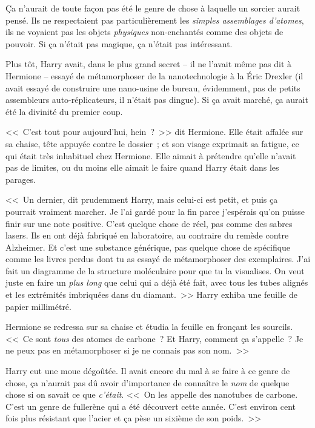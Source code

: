 Ça n'aurait de toute façon pas été le genre de chose à laquelle un sorcier aurait pensé. Ils ne respectaient pas particulièrement les \emph{simples assemblages d'atomes}, ils ne voyaient pas les objets \emph{physiques} non-enchantés comme des objets de pouvoir. Si ça n'était pas magique, ça n'était pas intéressant.

Plus tôt, Harry avait, dans le plus grand secret -- il ne l'avait même pas dit à Hermione -- essayé de métamorphoser de la nanotechnologie à la Éric Drexler (il avait essayé de construire une nano-usine de bureau, évidemment, pas de petits assembleurs auto-réplicateurs, il n'était pas dingue). Si ça avait marché, ça aurait été la divinité du premier coup.

<<~C'est tout pour aujourd'hui, hein~?~>> dit Hermione. Elle était affalée sur sa chaise, tête appuyée contre le dossier~; et son visage exprimait sa fatigue, ce qui était très inhabituel chez Hermione. Elle aimait à prétendre qu'elle n'avait pas de limites, ou du moins elle aimait le faire quand Harry était dans les parages.

<<~Un dernier, dit prudemment Harry, mais celui-ci est petit, et puis ça pourrait vraiment marcher. Je l'ai gardé pour la fin parce j'espérais qu'on puisse finir sur une note positive. C'est quelque chose de réel, pas comme des sabres lasers. Ils en ont déjà fabriqué en laboratoire, au contraire du remède contre Alzheimer. Et c'est une substance générique, pas quelque chose de spécifique comme les livres perdus dont tu as essayé de métamorphoser des exemplaires. J'ai fait un diagramme de la structure moléculaire pour que tu la visualises. On veut juste en faire un \emph{plus long} que celui qui a déjà été fait, avec tous les tubes alignés et les extrémités imbriquées dans du diamant.~>> Harry exhiba une feuille de papier millimétré.

Hermione se redressa sur sa chaise et étudia la feuille en fronçant les sourcils. <<~Ce sont \emph{tous} des atomes de carbone~? Et Harry, comment ça s'appelle~? Je ne peux pas en métamorphoser si je ne connais pas son nom.~>>

Harry eut une moue dégoûtée. Il avait encore du mal à se faire à ce genre de chose, ça n'aurait pas dû avoir d'importance de connaître le \emph{nom} de quelque chose si on savait ce que \emph{c'était}. <<~On les appelle des nanotubes de carbone. C'est un genre de fullerène qui a été découvert cette année. C'est environ cent fois plus résistant que l'acier et ça pèse un sixième de son poids.~>>

